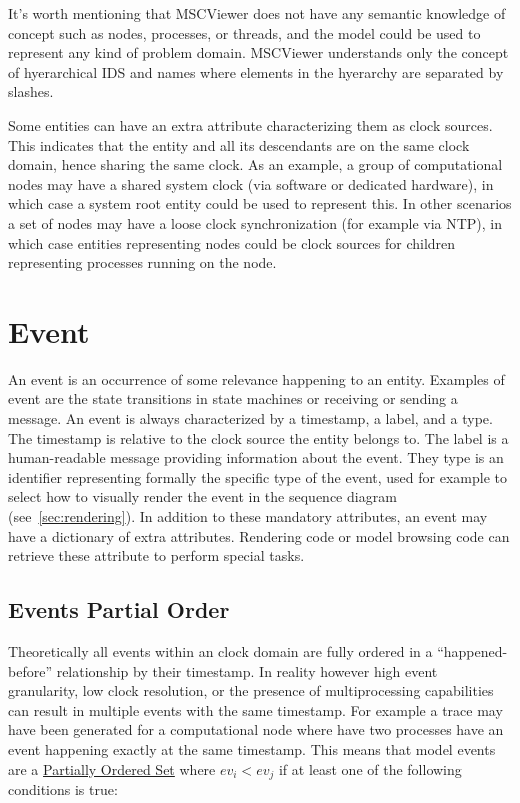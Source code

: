 \documentclass[11pt, twoside, titlepage]{book}
\newcommand{\prog}{MSCViewer}
\begin{document}
It's worth mentioning that \prog{} does not have any semantic knowledge of
concept such as nodes, processes, or threads, and the model could be used to
represent any kind of problem domain. \prog{} understands only the concept of
hyerarchical IDS and names where elements in the hyerarchy are separated by
slashes.

Some entities can have an extra attribute characterizing them as clock sources.
This indicates that the entity and all its descendants are on
the same clock domain, hence sharing the same clock. As an example, a group of
computational nodes may have a shared system clock (via software or dedicated
hardware), in which case a system root entity could be used to represent this.
In other scenarios a set of nodes may have a loose clock synchronization (for
example via NTP), in which case entities representing nodes could be clock
sources for children representing processes running on the node.


\section {Event} 
An event is an occurrence of some relevance happening to an entity. Examples of
event are the state transitions in state machines or receiving or sending a
message. An event is always characterized by a timestamp, a label, and a type.
The timestamp is relative to the clock source the entity belongs to. The label is a
human-readable message providing information about the event. They type is an
identifier representing formally the specific type of the event, used for
example to select how to visually render the event in the sequence diagram 
(see~\ref{sec:rendering}). In addition to these mandatory attributes, an event
may have a dictionary of extra attributes. Rendering code or model browsing code can retrieve these
attribute to perform special tasks.

\subsection{Events Partial Order}
\label{events-partial-order}
Theoretically all events within an clock domain are fully ordered in a
``happened-before'' relationship by their timestamp. In reality however high
event granularity, low clock resolution, or the presence of multiprocessing capabilities can result in
multiple events with the same timestamp. For example a trace may
have been generated for a computational node where have two processes have an
event happening exactly at the same timestamp. This means that model events are
a \href{http://en.wikipedia.org/wiki/Partially_ordered_set}{Partially Ordered
Set} where $ev_i < ev_j$ if at least one of the following conditions is true:
\end{document}

